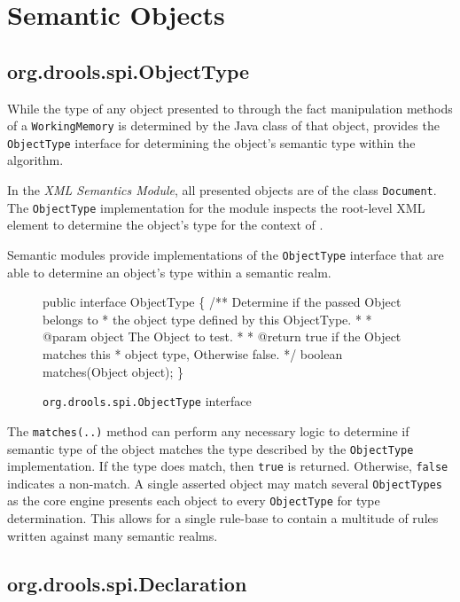 \section{Semantic Objects}

\subsection{org.drools.spi.ObjectType}

While the type of any object presented to \drools{} through
the fact manipulation methods of a \verb|WorkingMemory| is determined
by the Java class of that object, \drools{} provides the
\verb|ObjectType| interface for determining the object's semantic type
within the algorithm.

In the \emph{XML Semantics Module}, all presented objects are of the
class \verb|Document|.  The \verb|ObjectType| implementation
for the module inspects the root-level XML element to determine the
object's type for the context of \drools{}.

Semantic modules provide implementations of the \verb|ObjectType|
interface that are able to determine an object's type within
a semantic realm.

\begin{figure}
\begin{codelisting}
public interface ObjectType
\{
    /** Determine if the passed Object belongs to 
     *  the object type defined by this ObjectType.
     *
     *  @param object The Object to test.
     *
     *  @return true if the Object matches this 
     *          object type, Otherwise false.
     */
    boolean matches(Object object);
\}
\end{codelisting}
\caption{\texttt{org.drools.spi.ObjectType} interface}
\label{code.ObjectType}
\end{figure}

The \verb|matches(..)| method can perform any necessary logic 
to determine if semantic type of the object matches the type described
by the \verb|ObjectType| implementation. If
the type does match, then \verb|true| is returned.  Otherwise, 
\verb|false| indicates a non-match. A single asserted object may 
match several \verb|ObjectTypes| as the core engine presents each 
object to every \verb|ObjectType| for type determination.  This
allows for a single rule-base to contain a multitude of rules 
written against many semantic realms.

\subsection{org.drools.spi.Declaration}


